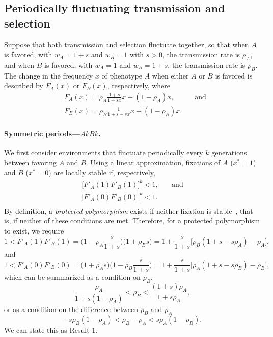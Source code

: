 \documentclass[14pt]{extarticle}
\begin{document}
\subsection*{Periodically fluctuating transmission and selection}

Suppose that both transmission and selection fluctuate together, so that when $A$ is favored, with $w_A=1+s$ and $w_B=1$ with $s>0$, the transmission rate is $\rho_A$, and when $B$ is favored, with $w_A=1$ and $w_B=1+s$, the transmission rate is $\rho_B$.
The change in the frequency $x$ of phenotype $A$ when either $A$ or $B$ is favored is described by $F_A(x)$ or $F_B(x)$, respectively, where
\begin{equation}\begin{aligned} \label{eq:recurrence_periodic_fluc}
&F_A(x) = \rho_A \frac{1+s}{1+sx} x + (1-\rho_A)x, &\quad \text{and} \\
&F_B(x) = \rho_B \frac{1}{1+s-sx} x + (1-\rho_B)x.
\end{aligned}\end{equation}

\paragraph{Symmetric periods---$AkBk$.}
We first consider environments that fluctuate periodically every $k$ generations between favoring $A$ and $B$.
Using a linear approximation, fixations of $A$ ($x^*=1$) and $B$ ($x^*=0$) are locally stable if, respectively,
\begin{equation}\begin{aligned}
\big[F'_A(1) F'_B(1)\big]^k < 1,  &\quad \text{and}\\
\big[F'_A(0) F'_B(0)\big]^k < 1. \\
\end{aligned}\end{equation}
By definition, a \emph{protected polymorphism} exists if neither fixation is stable~\citep{Prout1968}, that is, if neither of these conditions are met.
Therefore, for a protected polymorphism to exist, we require
\begin{equation}
1 < F'_A(1) F'_B(1) = \Big(1-\rho_A\frac{s}{1+s}\Big)\Big(1+\rho_B s\Big) 
= 1+\frac{s}{1+s}\big[\rho_B(1+s-s\rho_A)-\rho_A\big],
\end{equation}
and
\begin{equation}
1 < F'_A(0) F'_B(0) = \Big(1+\rho_A s\Big)\Big(1-\rho_B \frac{s}{1+s}\Big) 
= 1+\frac{s}{1+s}\big[\rho_A(1+s-s\rho_B)-\rho_B\big],
\end{equation}
which can be summarized as a condition on $\rho_B$,
\begin{equation} \label{eq:poly_condition_periodic_fluc}
\frac{\rho_A}{1+s(1-\rho_A)} < \rho_B < \frac{(1+s)\rho_A}{1+s\rho_A},
\end{equation}
or as a condition on the difference between $\rho_B$ and $\rho_A$
\begin{equation}
-s\rho_B(1-\rho_A) < \rho_B - \rho_A < s\rho_A(1-\rho_B).
\end{equation}
We can state this as Result 1. 
\end{document}
